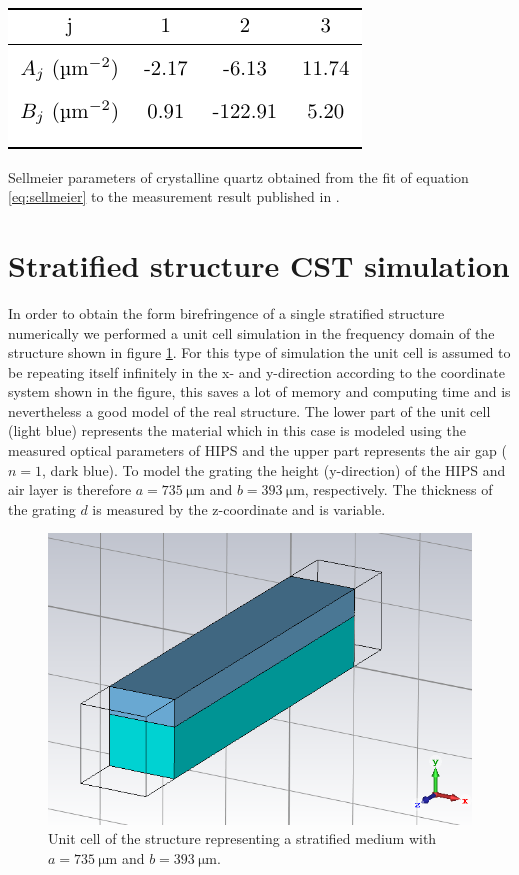 \begin{table}[H]
    \centering
    \includegraphics[scale=0.9]{images/appendix/sellmeier_parameters_table.pdf}
    \caption{Sellmeier parameters of crystalline quartz obtained from the fit of equation \ref{eq:sellmeier} to the measurement result published in \cite{DGrischkowsky1990}.}
    \label{tab:sellmeier_parameters_table}
\end{table}

\section{Stratified structure CST simulation}
\label{sec:CST simulation}
In order to obtain the form birefringence of a single stratified structure numerically we performed a unit cell simulation in the frequency domain of the structure shown in figure \ref{fig:CST_model}. For this type of simulation the unit cell is assumed to be repeating itself infinitely in the x- and y-direction according to the coordinate system shown in the figure, this saves a lot of memory and computing time and is nevertheless a good model of the real structure. The lower part of the unit cell (light blue) represents the material which in this case is modeled using the measured optical parameters of HIPS and the upper part represents the air gap ($n=1$, dark blue). To model the grating the height (y-direction) of the HIPS and air layer is therefore $a=\SI{735}{\micro \meter}$ and $b=\SI{393}{\micro \meter}$, respectively. The thickness of the grating $d$ is measured by the z-coordinate and is variable. 

\begin{figure}[H]
    \centering
    \includegraphics[scale=0.3]{images/appendix/CST.PNG}
    \caption{Unit cell of the structure representing a stratified medium with $a=\SI{735}{\micro \meter}$ and $b=\SI{393}{\micro \meter}$.}
    \label{fig:CST_model}
\end{figure}

